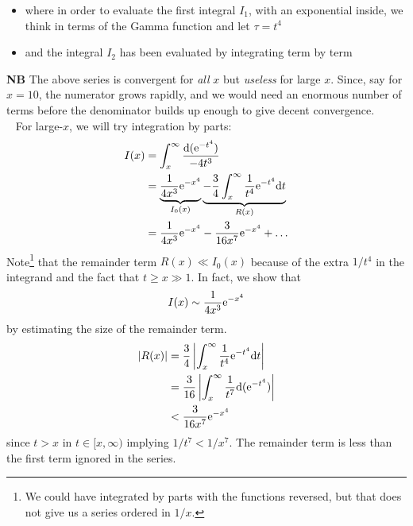 \begin{itemize}
	\item where in order to evaluate the first integral $I_1$, with an exponential inside, we think in terms of the Gamma function and let $\tau = t^4$
	\item and the integral $I_2$ has been evaluated by integrating term by term
\end{itemize}
{\bf NB} The above series is convergent for \emph{all} $x$ but \emph{useless} for large $x$. Since, say for $x=10$, the numerator grows rapidly, and we would need an enormous number of terms before the denominator builds up enough to give decent convergence. \\
\ \newline
For large-$x$, we will try integration by parts:
\begin{align}
	I(x) &= \int_{x}^{\infty} \frac{\mathrm{d} (\mathrm{e}^{-t^4})}{-4t^3} \nonumber \\
	&= \underbrace{\frac{1}{4x^3} \mathrm{e}^{-x^4}}_{I_0(x)} \underbrace{- \frac{3}{4} \int_{x}^{\infty}  \frac{1}{t^4}\mathrm{e}^{-t^4} \mathrm{d} t}_{R(x)} \nonumber \\
	&= \frac{1}{4x^3} \mathrm{e}^{-x^4} - \frac{3}{16 x^7} \mathrm{e}^{-x^4} + \dots \label{eqn:largex-limit}
\end{align}
Note\footnote{We could have integrated by parts with the functions reversed, but that does not give us a series ordered in $1/x$.} that the remainder term $R(x) \ll I_0(x)$ because of the extra $1/t^4$ in the integrand and the fact that $t \geq x \gg 1$. In fact, we show that
\begin{gather*}
	I(x) \sim \frac{1}{4x^3} \mathrm{e}^{-x^4}
\end{gather*}
by estimating the size of the remainder term. 
\begin{align*}
	|R(x)| &= \frac{3}{4} \left|\int_{x}^{\infty} \frac{1}{t^4} \mathrm{e}^{-t^4} \mathrm{d} t \right| \\
	&= \frac{3}{16} \left|\int_{x}^{\infty} \frac{1}{t^7} {\mathrm{d} (\mathrm{e}^{-t^4})} \right| \\
	&< \frac{3}{16 x^7} \mathrm{e}^{-x^4}
\end{align*}
since $t>x$ in $t \in [x,\infty)$ implying $1/t^7 < 1/x^7$. The remainder term is less than the first term ignored in the series.

